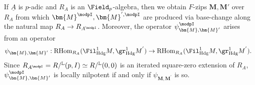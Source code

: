 \documentclass[10pt]{amsart}
\begin{document}
\begin{remark}
\label{rem:operator_needs_to_be_nilpotent}
If $\underline{A}$ is $p$-adic and $R_A$ is an $\Field_p$-algebra, then we obtain $F$-zips $\bm{M},\bm{M}'$ over $R_A$ from which $\bm{M}^\modpI,\bm{M}^{',\modpI}$ are produced via base-change along the natural map $R_A\to R_{A^\modpI}$. Moreover, the operator $\psi^\modpI_{\bm{M},\bm{M}'}$ arises from an operator
\[
\psi_{\bm{M},\bm{M}'}:\mathrm{RHom}_{R_{A}}(\Fil^1_{\mathrm{Hdg}}M,\gr^{1}_{\mathrm{Hdg}}M^{'})\to \mathrm{RHom}_{R_{A}}(\Fil^1_{\mathrm{Hdg}}M,\gr^{1}_{\mathrm{Hdg}}M^{'}).
\]
Since $R_{A^\modpI} = R/{}^{\mathbb{L}}(p,I)\simeq R/{}^{\mathbb{L}}(0,0)$ is an iterated square-zero extension of $R_A$, $\psi^\modpI_{\bm{M},\bm{M}'}$ is locally nilpotent if and only if $\psi_{\bm{M},\bm{M}^{'}}$ is so.
\end{remark}
\end{document}
